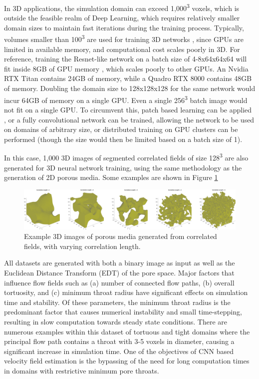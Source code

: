 \documentclass{article}
\begin{document}
In 3D applications, the simulation domain can exceed 1,000\textsuperscript{3} voxels, which is outside the feasible realm of Deep Learning, which requires relatively smaller domain sizes to maintain fast iterations during the training process. Typically, volumes smaller than 100\textsuperscript{3} are used for training 3D networks \cite{wangedsrgan,poreflownet,autodeskflow,wang2020physical}, since GPUs are limited in available memory, and computational cost scales poorly in 3D. For reference, training the Resnet-like network on a batch size of 4-8x64x64x64 will fit inside 8GB of GPU memory \cite{naifregression}, which scales poorly to other GPUs. An Nvidia RTX Titan contains 24GB of memory, while a Quadro RTX 8000 contains 48GB of memory. Doubling the domain size to 128x128x128 for the same network would incur 64GB of memory on a single GPU. Even a single 256\textsuperscript{3} batch image would not fit on a single GPU. To circumvent this, patch based learning can be applied \cite{poreflownet}, or a fully convolutional network can be trained, allowing the network to be used on domains of arbitrary size, or distributed training on GPU clusters can be performed (though the size would then be limited based on a batch size of 1).

In this case, 1,000 3D images of segmented correlated fields of size 128\textsuperscript{3} are also generated for 3D neural network training, using the same methodology as the generation of 2D porous media. Some examples are shown in Figure \ref{fig:3dsimpcomp}

\begin{figure}
  \centering
    \includegraphics[width=\textwidth]{./figures/geom3DCompare.png}
    \caption{Example 3D images of porous media generated from correlated fields, with varying correlation length.}
    \label{fig:3dsimpcomp}
\end{figure}

All datasets are generated with both a binary image as input as well as the Euclidean Distance Transform (EDT) of the pore space. Major factors that influence flow fields such as (a) number of connected flow paths, (b) overall tortuosity, and (c) minimum throat radius have significant effects on simulation time and stability. Of these parameters, the minimum throat radius is the predominant factor that causes numerical instability and small time-stepping, resulting in slow computation towards steady state conditions. There are numerous examples within this dataset of tortuous and tight domains where the principal flow path contains a throat with 3-5 voxels in diameter, causing a significant increase in simulation time. One of the objectives of CNN based velocity field estimation is the bypassing of the need for long computation times in domains with restrictive minimum pore throats.
\end{document}
